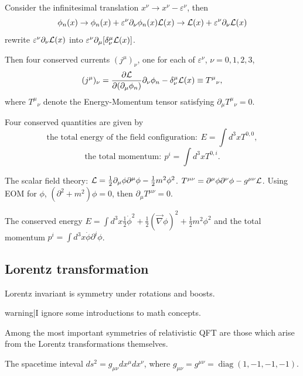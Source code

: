     \qquad Consider the infinitesimal translation $x^\nu \rightarrow x^\nu - \varepsilon^\nu$, then
            \begin{equation*}
                \phi_n(x) \rightarrow \phi_n(x) + \varepsilon^\nu \partial_\nu \phi_n(x)\\
                \mathcal{L}(x) \rightarrow \mathcal{L}(x) + \varepsilon^\nu \partial_\nu \mathcal{L}(x)
            \end{equation*}
    rewrite $\varepsilon^\nu \partial_\nu \mathcal{L}(x)$ into $\varepsilon^\nu \partial_\mu [ \delta^\mu_\nu \mathcal{L}(x)]$.

    \qquad Then four conserved currents $(j^\mu)_\nu$, one for each of $\varepsilon^\nu$, $\nu=0,1,2,3$,
        $$(j^\mu)_\nu = \frac{\partial \mathcal{L}}{\partial(\partial_\mu \phi_n)} \partial_\nu \phi_n - \delta^\mu_\nu \mathcal{L}(x) \equiv {T^\mu}_{\nu},$$
where ${T^\mu}_{\nu}$ denote the Energy-Momentum tensor satisfying $\partial_\mu {T^\mu}_{\nu}=0$.

    \qquad Four conserved quantities are given by
        $$\text{the total energy of the field configuration}:\ E= \int d^3x T^{0,0},$$
        $$\text{the total momentum}:\ p^i = \int d^3 x T^{0,i}.$$

\begin{example} The scalar field theory: $\mathcal{L} = \frac{1}{2} \partial_\mu \phi \partial^\mu \phi - \frac{1}{2} m^2 \phi^2$. $T^{\mu\nu} = \partial^\mu \phi \partial^\nu \phi - g^{\mu \nu} \mathcal{L}$. Using
    EOM for $\phi$, $(\partial^2 + m^2) \phi=0$, then $\partial_\mu T^{\mu \nu}=0$.

    \qquad The conserved energy $E= \int d^3x \frac{1}{2} \dot{\phi}^2 + \frac{1}{2}(\vec{\nabla} \phi)^2 + \frac{1}{2}m^2 \phi^2$ and the total momentum $p^i = \int d^3 x \dot{\phi}\partial^i \phi$.

\end{example}

\subsection{Lorentz transformation}
    \qquad Lorentz invariant is symmetry under rotations and boosts.

{{warning|I ignore some introductions to math concepts.}}

    \qquad Among the most important symmetries of relativistic QFT are those which arise from the Lorentz transformations themselves.

    \qquad The spacetime inteval $ds^2= g_{\mu \nu} dx^\mu dx^\nu$, where $g_{\mu\nu} = g^{\mu \nu} = \operatorname{diag} (1,-1,-1,-1)$.

